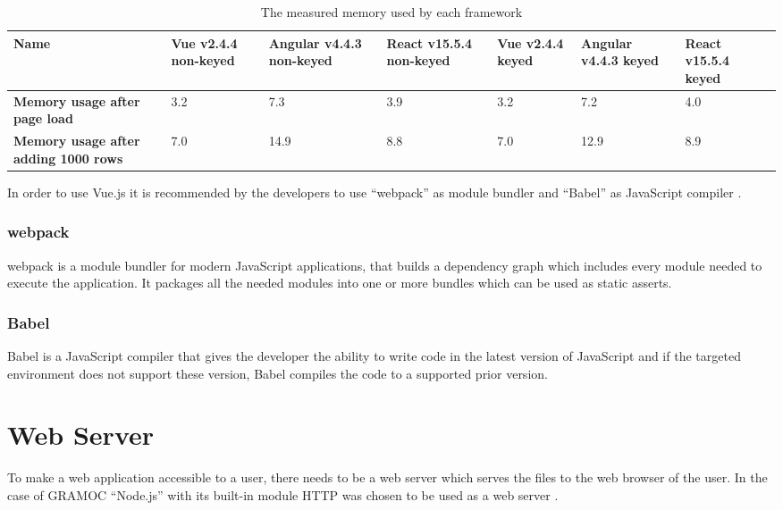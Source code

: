 \begin{table}[H]
    \centering
    \begin{tabular}{| C{2.2cm} | C{1.5cm} | C{1.5cm} | C{1.5cm} | C{1.5cm} | C{1.5cm} | C{1.5cm} |}
    \hline
    \textbf{Name} & \textbf{Vue v2.4.4 non-keyed} & \textbf{Angular v4.4.3 non-keyed} & \textbf{React v15.5.4 non-keyed} & \textbf{Vue v2.4.4 keyed} & \textbf{Angular v4.4.3 keyed} & \textbf{React v15.5.4 keyed} \\ \hline
    \textbf{Memory usage after page load} & 3.2 & 7.3 & 3.9 & 3.2 & 7.2 & 4.0 \\ \hline
    \textbf{Memory usage after adding 1000 rows} & 7.0 & 14.9 & 8.8 & 7.0 & 12.9 & 8.9 \\
    \hline
    \end{tabular}
    \caption{The measured memory used by each framework}
    \label{tab:framework_perf_mem}
\end{table}

In order to use Vue.js it is recommended by the developers to use ``webpack''  as module bundler and ``Babel'' as JavaScript compiler \cite{webpack} \cite{Babel}.

\subsubsection{webpack}
webpack is a module bundler for modern JavaScript applications, that builds a dependency graph which includes every module needed to execute the application. It packages all the needed modules into one or more bundles which can be used as static asserts.

\subsubsection{Babel}
Babel is a JavaScript compiler that gives the developer the ability to write code in the latest version of JavaScript and if the targeted environment does not support these version, Babel compiles the code to a supported prior version.

\section{Web Server}
To make a web application accessible to a user, there needs to be a web server which serves the files to the web browser of the user. In the case of GRAMOC ``Node.js'' with its built-in module HTTP was chosen to be used as a web server \cite{Node}.

